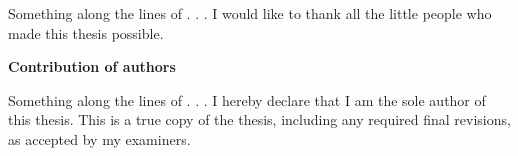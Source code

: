 Something along the lines of . . . I would like to thank all the little people who made this thesis possible.
\cleardoublepage

 \begin{center}\textbf{Contribution of authors}\end{center}
  
 \noindent
Something along the lines of . . . I hereby declare that I am the sole author of this thesis. This is a true copy of the thesis, including any required final revisions, as accepted by my examiners.

\cleardoublepage




